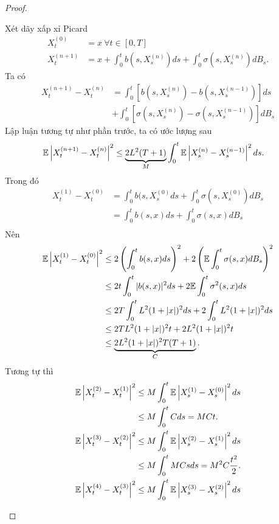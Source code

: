 \begin{proof}
\begin{enumerate}
    Xét dãy xấp xỉ Picard 
    \begin{align*}
        X_t^{(0)} &= x ~\forall t \in [0,T]\\
        X_t^{(n+1)} &= x + \int_0^t{b(s,X_s^{(n)})ds} + \int_0^t{\sigma(s,X_s^{(n)})dB_s}.
    \end{align*}
    Ta có
    \begin{align*}
        X_t^{(n+1)} - X_t^{(n)} 
        &= \int_0^t{[b(s,X_s^{(n)})-b(s,X_s^{(n-1)})]ds} \\
        &+ \int_0^t{[\sigma(s,X_s^{(n)})-\sigma(s,X_s^{(n-1)})]dB_s}
    \end{align*}
    Lập luận tương tự như phần trước, ta có ước lượng sau
    \begin{align*}
        \mathbb{E}\left|X_t^{(n+1)}-X_t^{(n)}\right|^2 
        &\leq \underbrace{2L^2(T+1)}_{M}\int_0^t{\mathbb{E}\left|X_s^{(n)}-X_s^{(n-1)}\right|^2ds}.
    \end{align*}
    Trong đó
    \begin{align*}
        X_t^{(1)}-X_t^{(0)}
        &= \int_0^t{b(s,X_s^{(0)}ds} +\int_0^t{\sigma(s,X_s^{(0)})dB_s}\\
        &= \int_0^t{b(s,x)ds} +\int_0^t{\sigma(s,x)dB_s}\\
    \end{align*}
    Nên 
    \begin{align*}
        \mathbb{E}\left|X_t^{(1)}-X_t^{(0)}\right|^2 
        &\leq 2\left(\int_0^t{b(s,x)ds}\right)^2+2\left(\mathbb{E}\int_0^t{\sigma(s,x)dB_s}\right)^2\\
        &\leq 2t\int_0^t|b(s,x)|^2ds+2\mathbb{E}\int_0^t{\sigma^2(s,x)ds}\\
        &\leq 2T\int_0^t{L^2(1+|x|)^2ds} + 2\int_0^t{L^2(1+|x|)^2ds}\\
        &\leq 2TL^2(1+|x|)^2t + 2L^2(1+|x|)^2t\\
        &\leq \underbrace{2L^2(1+|x|)^2T(T+1)}_{C}.
    \end{align*}
    Tương tự thì 
    \begin{align*}
        \E\left|X_t^{(2)}-X_t^{(1)}\right|^2 
        &\leq M\int_0^t{\E\left|X_s^{(1)}-X_s^{(0)}\right|^2ds}\\
        &\leq M\int_0^t{Cds} = MCt.\\
        \E\left|X_t^{(3)}-X_t^{(2)}\right|^2 
        &\leq M\int_0^t{\E\left|X_s^{(2)}-X_s^{(1)}\right|^2ds}\\
        &\leq M\int_0^t{MCsds} = M^2C\dfrac{t^2}{2}.\\
        \E\left|X_t^{(4)}-X_t^{(3)}\right|^2 
        &\leq M\int_0^t{\E\left|X_s^{(3)}-X_s^{(2)}\right|^2ds}\\

\end{align*}
\end{enumerate}
\end{proof}
